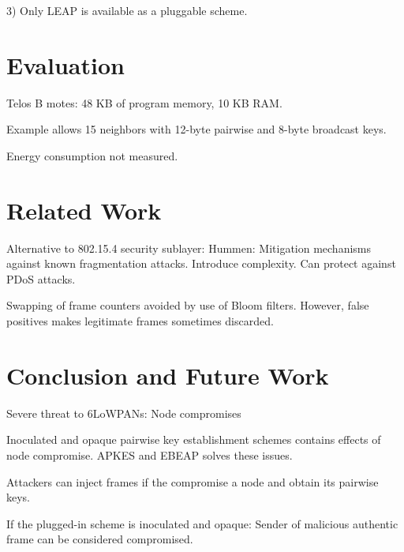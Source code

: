\documentclass[10pt]{article}
\begin{document}
3) Only LEAP is available as a pluggable scheme.


\section{Evaluation}

\noindent

Telos B motes: 48 KB of program memory, 10 KB RAM.

Example allows 15 neighbors with 12-byte pairwise and 8-byte broadcast keys.

Energy consumption not measured. 


\section{Related Work}

\noindent

Alternative to 802.15.4 security sublayer: Hummen: Mitigation mechanisms against known fragmentation attacks. Introduce complexity. Can protect against PDoS attacks.

Swapping of frame counters avoided by use of Bloom filters. However, false positives makes legitimate frames sometimes discarded. 

\section{Conclusion and Future Work}

\noindent

Severe threat to 6LoWPANs: Node compromises

Inoculated and opaque pairwise key establishment schemes contains effects of node compromise. APKES and EBEAP solves these issues.

Attackers can inject frames if the compromise a node and obtain its pairwise keys. 

If the plugged-in scheme is inoculated and opaque: Sender of malicious authentic frame can be considered compromised.  
\end{document}
